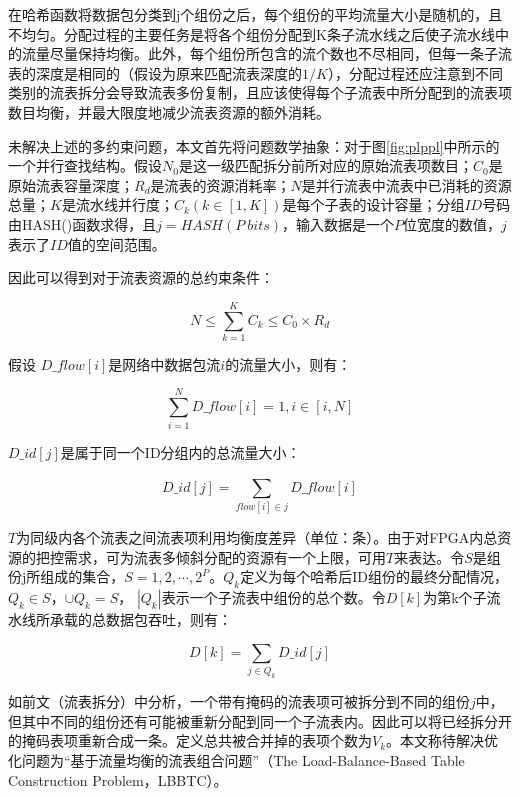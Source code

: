 在哈希函数将数据包分类到j个组份之后，每个组份的平均流量大小是随机的，且不均匀。分配过程的主要任务是将各个组份分配到K条子流水线之后使子流水线中的流量尽量保持均衡。此外，每个组份所包含的流个数也不尽相同，但每一条子流表的深度是相同的（假设为原来匹配流表深度的$ 1/K $），分配过程还应注意到不同类别的流表拆分会导致流表多份复制，且应该使得每个子流表中所分配到的流表项数目均衡，并最大限度地减少流表资源的额外消耗。

未解决上述的多约束问题，本文首先将问题数学抽象：对于图\ref{fig:plppl}中所示的一个并行查找结构。假设$N_0$是这一级匹配拆分前所对应的原始流表项数目；$C_0$是原始流表容量深度；$R_d$是流表的资源消耗率；$N$是并行流表中流表中已消耗的资源总量；$K$是流水线并行度；$C_k(k\in [1,K])$是每个子表的设计容量；分组$ ID $号码由HASH()函数求得，且$ j=HASH(P~bits) $，输入数据是一个$ P $位宽度的数值，$ j $表示了$ ID $值的空间范围。

因此可以得到对于流表资源的总约束条件：

\begin{equation} \label{pl2}
N \leq \sum_{k=1}^{K}C_k \leq C_0 \times R_d
\end{equation}

假设 $D\_flow[i]$是网络中数据包流$ i $的流量大小，则有：

\begin{equation} \label{pl3}
\sum_{i=1}^{N}D\_flow[i]=1,i \in [i,N]
\end{equation}

$D\_id[j]$是属于同一个ID分组内的总流量大小：

\begin{equation} \label{pl4}
D\_id[j]=\sum_{flow[i]\in j}^{}D\_flow[i]
\end{equation}

$T$为同级内各个流表之间流表项利用均衡度差异（单位：条）。由于对FPGA内总资源的把控需求，可为流表多倾斜分配的资源有一个上限，可用$T$来表达。令$S$是组份j所组成的集合，$S={1,2,\cdots,2^P}$。$Q_k$定义为每个哈希后ID组份的最终分配情况，$Q_k \in S$，$\cup Q_k=S$， $|Q_k|$表示一个子流表中组份的总个数。令$D[k]$为第k个子流水线所承载的总数据包吞吐，则有：

\begin{equation} \label{pl5}
D[k]=\sum_{j\in Q_k}D\_id[j]
\end{equation}

如前文（流表拆分）中分析，一个带有掩码的流表项可被拆分到不同的组份$ j $中，但其中不同的组份还有可能被重新分配到同一个子流表内。因此可以将已经拆分开的掩码表项重新合成一条。定义总共被合并掉的表项个数为$V_k$。本文称待解决优化问题为“基于流量均衡的流表组合问题”（The Load-Balance-Based Table Construction Problem，LBBTC）。

